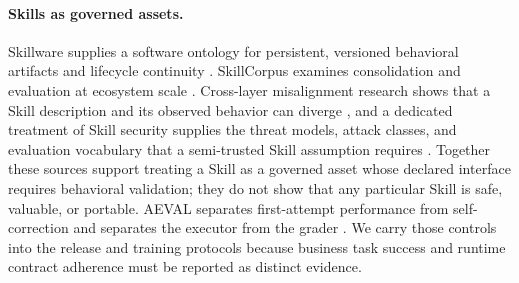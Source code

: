 \paragraph{Skills as governed assets.}
Skillware supplies a software ontology for persistent, versioned behavioral artifacts and lifecycle continuity \cite{fan2026skillware}. SkillCorpus examines consolidation and evaluation at ecosystem scale \cite{wang2026skillcorpus}. Cross-layer misalignment research shows that a Skill description and its observed behavior can diverge \cite{zhang2026misalignment}, and a dedicated treatment of Skill security supplies the threat models, attack classes, and evaluation vocabulary that a semi-trusted Skill assumption requires \cite{badhe2026skillsecurity}. Together these sources support treating a Skill as a governed asset whose declared interface requires behavioral validation; they do not show that any particular Skill is safe, valuable, or portable. AEVAL separates first-attempt performance from self-correction and separates the executor from the grader \cite{anand2026aeval}. We carry those controls into the release and training protocols because business task success and runtime contract adherence must be reported as distinct evidence.

